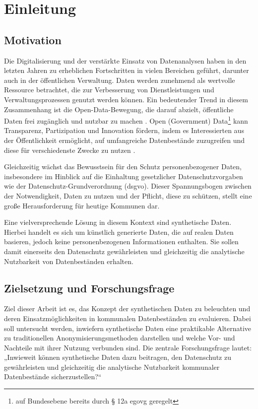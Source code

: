 \chapter{Einleitung}
\label{cha:einleitung}

\section{Motivation}
\label{sec:motivation}
\begin{spacing}{1.5}

Die Digitalisierung und der verstärkte Einsatz von Datenanalysen haben in den letzten Jahren zu erheblichen Fortschritten in vielen Bereichen geführt, darunter auch in der öffentlichen Verwaltung. Daten werden zunehmend als wertvolle Ressource betrachtet, die zur Verbesserung von Dienstleistungen und Verwaltungsprozessen genutzt werden können. Ein bedeutender Trend in diesem Zusammenhang ist die Open-Data-Bewegung, die darauf abzielt, öffentliche Daten frei zugänglich und nutzbar zu machen \cite[560]{wewer_offene_2019}. Open (Government) Data\footnote{auf Bundesebene bereits durch § 12a \acrshort{egovg} geregelt} kann Transparenz, Partizipation und Innovation fördern, indem es Interessierten aus der Öffentlichkeit ermöglicht, auf umfangreiche Datenbestände zuzugreifen und diese für verschiedenste Zwecke zu nutzen \cite[S. 11 f.]{bieker_open_2019}.

Gleichzeitig wächst das Bewusstsein für den Schutz personenbezogener Daten, insbesondere im Hinblick auf die Einhaltung gesetzlicher Datenschutzvorgaben wie der Datenschutz-Grundverordnung (\acrshort{dsgvo}). Dieser Spannungsbogen zwischen der Notwendigkeit, Daten zu nutzen und der Pflicht, diese zu schützen, stellt eine große Herausforderung für heutige Kommunen dar.

Eine vielversprechende Lösung in diesem Kontext sind synthetische Daten. Hierbei handelt es sich um künstlich generierte Daten, die auf realen Daten basieren, jedoch keine personenbezogenen Informationen enthalten. Sie sollen damit einerseits den Datenschutz gewährleisten und gleichzeitig die analytische Nutzbarkeit von Datenbeständen erhalten.

\end{spacing}
\section{Zielsetzung und Forschungsfrage}
\label{sec:ziel_und_forschungsfrage}
\begin{spacing}{1.5}

Ziel dieser Arbeit ist es, das Konzept der synthetischen Daten zu beleuchten und deren Einsatzmöglichkeiten in kommunalen Datenbeständen zu evaluieren. Dabei soll untersucht werden, inwiefern synthetische Daten eine praktikable Alternative zu traditionellen Anonymisierungsmethoden darstellen und welche Vor- und Nachteile mit ihrer Nutzung verbunden sind. Die zentrale Forschungsfrage lautet: „Inwieweit können synthetische Daten dazu beitragen, den Datenschutz zu gewährleisten und gleichzeitig die analytische Nutzbarkeit kommunaler Datenbestände sicherzustellen?“

\end{spacing}
